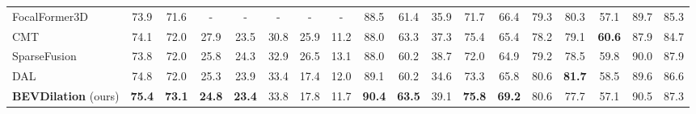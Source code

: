 \documentclass[11pt]{article}
\begin{document}
\begin{table}[htbp]
{\begin{tabular}{l|cc|ccccc|cccccccccc}
        FocalFormer3D~ & 73.9 & 71.6 & - & - & - & - & - & 88.5 & 61.4 & 35.9 & 71.7 & 66.4 & 79.3 & 80.3 & 57.1 & 89.7 & 85.3 \\
        CMT~ & 74.1 & 72.0 & 27.9 & 23.5 & 30.8 & 25.9 & 11.2 & 88.0 & 63.3 & 37.3 & {75.4} & {65.4} & 78.2 & 79.1 & \textbf{60.6} & 87.9 & 84.7 \\
        SparseFusion~ & 73.8 & 72.0 & 25.8 & 24.3 & 32.9 & 26.5 & 13.1 & 88.0 & 60.2 & 38.7 & 72.0 & 64.9 & 79.2 & 78.5 & 59.8 & 90.0 & 87.9 \\
        DAL~ & 74.8 & 72.0 & 25.3 & 23.9 & 33.4 & 17.4 & 12.0 & 89.1 & 60.2 & 34.6 & 73.3 & 65.8  & 80.6 & \textbf{81.7} & 58.5 & 89.6 & 86.6  \\
        \midrule
        \textbf{BEVDilation} (ours) & \textbf{75.4} & \textbf{73.1} & \textbf{24.8} & \textbf{23.4} & 33.8 & 17.8 & 11.7 & \textbf{90.4} & \textbf{63.5} &  39.1 & \textbf{75.8} & \textbf{69.2} &  {80.6} & 77.7 & 57.1 & 90.5 & {87.3} \\
        \bottomrule
        \end{tabular}
}
\end{table}
\end{document}

